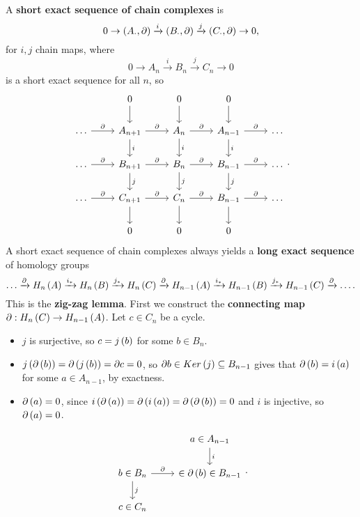 A \textbf{short exact sequence of chain complexes} is
$$ 0 \to \left( A_\cdot, \partial \right) \xrightarrow{i} \left( B_\cdot, \partial \right) \xrightarrow{j} \left( C_\cdot, \partial \right) \to 0, $$
for $ i, j $ chain maps, where
$$ 0 \to A_n \xrightarrow{i} B_n \xrightarrow{j} C_n \to 0 $$
is a short exact sequence for all $ n $, so
$$
\begin{tikzcd}
& 0 \arrow{d} & 0 \arrow{d} & 0 \arrow{d} & \\
\dots \arrow{r}{\partial} & A_{n + 1} \arrow{r}{\partial} \arrow{d}{i} & A_n \arrow{r}{\partial} \arrow{d}{i} & A_{n - 1} \arrow{r}{\partial} \arrow{d}{i} & \dots \\
\dots \arrow{r}{\partial} & B_{n + 1} \arrow{r}{\partial} \arrow{d}{j} & B_n \arrow{r}{\partial} \arrow{d}{j} & B_{n - 1} \arrow{r}{\partial} \arrow{d}{j} & \dots \\
\dots \arrow{r}{\partial} & C_{n + 1} \arrow{r}{\partial} \arrow{d} & C_n \arrow{r}{\partial} \arrow{d} & B_{n - 1} \arrow{r}{\partial} \arrow{d} & \dots \\
& 0 & 0 & 0 &
\end{tikzcd}.
$$
A short exact sequence of chain complexes always yields a \textbf{long exact sequence} of homology groups
$$ \dots \xrightarrow{\partial} H_n\left( A \right) \xrightarrow{i_*} H_n\left( B \right) \xrightarrow{j_*} H_n\left( C \right) \xrightarrow{\partial} H_{n - 1}\left( A \right) \xrightarrow{i_*} H_{n - 1}\left( B \right) \xrightarrow{j_*} H_{n - 1}\left( C \right) \xrightarrow{\partial} \dots. $$
This is the \textbf{zig-zag lemma}. First we construct the \textbf{connecting map} $ \partial : H_n\left( C \right) \to H_{n - 1}\left( A \right) $. Let $ c \in C_n $ be a cycle.
\begin{itemize}
\item $ j $ is surjective, so $ c = j\left( b \right) $ for some $ b \in B_n $.
\item $ j\left( \partial\left( b \right) \right) = \partial\left( j\left( b \right) \right) = \partial c = 0 $, so $ \partial b \in Ker\left( j \right) \subseteq B_{n - 1} $ gives that $ \partial\left( b \right) = i\left( a \right) $ for some $ a \in A_{n - 1} $, by exactness.
\item $ \partial\left( a \right) = 0 $, since $ i\left( \partial\left( a \right) \right) = \partial\left( i\left( a \right) \right) = \partial\left( \partial\left( b \right) \right) = 0 $ and $ i $ is injective, so $ \partial\left( a \right) = 0 $.
\end{itemize}
$$
\begin{tikzcd}
& a \in A_{n - 1} \arrow{d}{i} \\
b \in B_n \arrow{r}{\partial} \arrow{d}{j} & \in \partial\rb{b} \in B_{n - 1} \\
c \in C_n &
\end{tikzcd}.
$$

